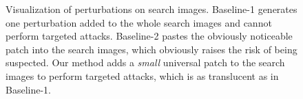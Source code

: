 \documentclass[journal]{IEEEtran}
\renewcommand{\uline}{}
\begin{document}
\begin{figure}[t]
  \centering
  \caption{Visualization of perturbations on search images. Baseline-1 generates \uline{one perturbation} added to the whole search \uline{images} and cannot perform targeted attacks. Baseline-2 pastes \uline{the} obviously noticeable patch into the search \uline{images}, which obviously raises the risk of being suspected. Our method adds a \textit{small} universal patch to the search \uline{images} to perform targeted attacks, which \uline{is} as translucent as in Baseline-1.}
  \label{fig:imperceptible}
  \vspace{-3mm}
\end{figure}
\end{document}
